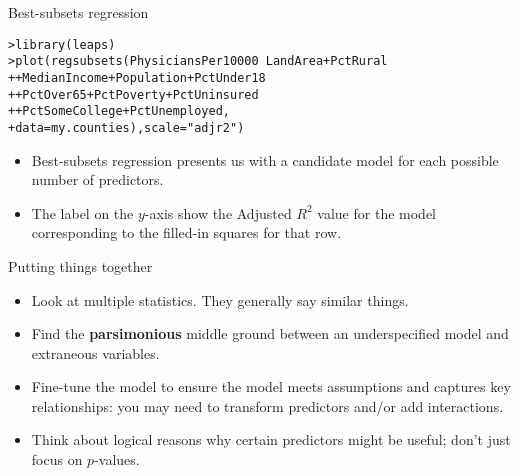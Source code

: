 \documentclass{beamer}\usepackage[]{graphicx}\usepackage[]{color}
\makeatletter
\newcommand{\hlstr}[1]{\textcolor[rgb]{1,0.894,0.71}{#1}}%
\newcommand{\hlopt}[1]{\textcolor[rgb]{1,0.894,0.769}{#1}}%
\newcommand{\hlstd}[1]{\textcolor[rgb]{1,0.894,0.769}{#1}}%
\newcommand{\hlkwc}[1]{\textcolor[rgb]{0.78,0.941,0.545}{#1}}%
\newcommand{\hlkwd}[1]{\textcolor[rgb]{1,0.78,0.769}{#1}}%
\newenvironment{kframe}{%
 \def\at@end@of@kframe{}%
 \ifinner\ifhmode%
  \def\at@end@of@kframe{\end{minipage}}%
  \begin{minipage}{\columnwidth}%
 \fi\fi%
 \def\FrameCommand##1{\hskip\@totalleftmargin \hskip-\fboxsep
 \colorbox{shadecolor}{##1}\hskip-\fboxsep
     \hskip-\linewidth \hskip-\@totalleftmargin \hskip\columnwidth}%
 \MakeFramed {\advance\hsize-\width
   \@totalleftmargin\z@ \linewidth\hsize
   \@setminipage}}%
 {\par\unskip\endMakeFramed%
 \at@end@of@kframe}
\newenvironment{knitrout}{}{} %
\makeatother
\begin{document}
\begin{darkframes}
    \begin{frame}[fragile]{Best-subsets regression}
      \fontsm
\begin{knitrout}
\begin{kframe}
\begin{alltt}
\hlstd{> }\hlkwd{library}\hlstd{(leaps)}
\hlstd{> }\hlkwd{plot}\hlstd{(}\hlkwd{regsubsets}\hlstd{(PhysiciansPer10000} \hlopt{~} \hlstd{LandArea} \hlopt{+} \hlstd{PctRural}
\hlstd{+ }                 \hlopt{+} \hlstd{MedianIncome} \hlopt{+} \hlstd{Population} \hlopt{+} \hlstd{PctUnder18}
\hlstd{+ }                 \hlopt{+} \hlstd{PctOver65} \hlopt{+} \hlstd{PctPoverty} \hlopt{+} \hlstd{PctUninsured}
\hlstd{+ }                 \hlopt{+} \hlstd{PctSomeCollege} \hlopt{+} \hlstd{PctUnemployed,}
\hlstd{+ }                 \hlkwc{data}\hlstd{=my.counties),} \hlkwc{scale}\hlstd{=}\hlstr{"adjr2"}\hlstd{)}
\end{alltt}
\end{kframe}
\end{knitrout}
    \end{frame}

    \begin{frame}
      \vspace{-1in}
\begin{knitrout}


\end{knitrout}
    \end{frame}

    \begin{frame}
      \begin{itemize}
        \item Best-subsets regression presents us with a candidate model for each possible number of predictors.
        \item The label on the $y$-axis show the Adjusted $R^2$ value for the model corresponding to the filled-in squares for that row.
      \end{itemize}
    \end{frame}

    \begin{frame}{Putting things together}
      \begin{itemize}[<+->]
        \item Look at multiple statistics. They generally say similar things.
        \item Find the \textbf{parsimonious} middle ground between an underspecified model and extraneous variables.
        \item Fine-tune the model to ensure the model meets assumptions and captures key relationships: you may need to transform predictors and/or add interactions.
        \item Think about logical reasons why certain predictors might be useful; don't just focus on $p$-values.
      \end{itemize}
    \end{frame}


\end{darkframes}
\end{document}
